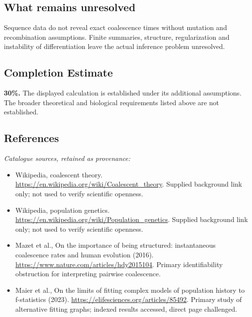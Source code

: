 \documentclass[11pt]{article}
\begin{document}
\subsection{What remains unresolved}
Sequence data do not reveal exact coalescence times without mutation and recombination assumptions. Finite summaries, structure, regularization and instability of differentiation leave the actual inference problem unresolved.
\subsection{Completion Estimate}
\textbf{30\%.} The displayed calculation is established under its additional assumptions. The broader theoretical and biological requirements listed above are not established.
\subsection{References}
\noindent\emph{Catalogue sources, retained as provenance:}
\begin{itemize}
\item Wikipedia, coalescent theory. \url{https://en.wikipedia.org/wiki/Coalescent_theory}. Supplied background link only; not used to verify scientific openness.
\item Wikipedia, population genetics. \url{https://en.wikipedia.org/wiki/Population_genetics}. Supplied background link only; not used to verify scientific openness.
\item Mazet et al., On the importance of being structured: instantaneous coalescence rates and human evolution (2016). \url{https://www.nature.com/articles/hdy2015104}. Primary identifiability obstruction for interpreting pairwise coalescence.
\item Maier et al., On the limits of fitting complex models of population history to f-statistics (2023). \url{https://elifesciences.org/articles/85492}. Primary study of alternative fitting graphs; indexed results accessed, direct page challenged.
\end{itemize}
\end{document}
